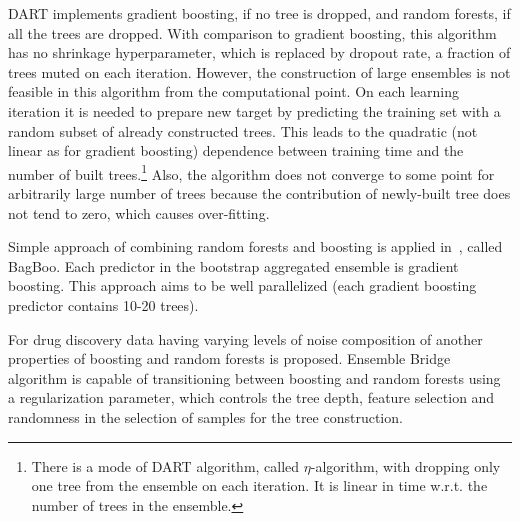 DART implements gradient boosting, if no tree is dropped, and random forests, if all the trees are dropped.
With comparison to gradient boosting, this algorithm has no shrinkage hyperparameter, which is replaced by dropout rate, a fraction of trees muted on each iteration.
However, the construction of large ensembles is not feasible in this algorithm from the computational point.
On each learning iteration it is needed to prepare new target by predicting the training set with a random subset of already constructed trees.
This leads to the quadratic (not linear as for gradient boosting) dependence between training time and the number of built trees.\footnote{
There is a mode of DART algorithm, called $\eta$-algorithm, with dropping only one tree from the ensemble on each iteration.
It is linear in time w.r.t. the number of trees in the ensemble.}
Also, the algorithm does not converge to some point for arbitrarily large number of trees because the contribution of newly-built tree does not tend to zero, which causes over-fitting.

Simple approach of combining random forests and boosting is applied in~\cite{key-bagboo}, called BagBoo. Each predictor in the bootstrap aggregated ensemble is gradient boosting. This approach aims to be well parallelized (each gradient boosting predictor contains 10-20 trees).

For drug discovery data having varying levels of noise composition of another properties of boosting and random forests is proposed. Ensemble Bridge~\cite{key-bridge} algorithm is capable of transitioning between boosting and random forests using a regularization parameter, which controls the tree depth, feature selection and randomness in the selection of samples for the tree construction. 

